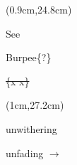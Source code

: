 \documentclass[a4paper,10pt]{article}
\begin{document}
\begin{textblock*}{2in}(0.9cm,24.8cm)%
    \small
    \begin{minipage}{2in} 
        \color{blue}
        See\par
        Burpee\{?\}\par
        \color{red}
        \sout{\{x x\}}\par
        \normalsize
    \end{minipage}%
\end{textblock*}%

\color{red}
\begin{textblock*}{5cm}(1cm,27.2cm)%
    \small
    \begin{minipage}{5cm} 
        \color{red}
        unwithering\par
        unfading $\rightarrow$
        \normalsize
    \end{minipage}%
\end{textblock*}%
\end{document}

